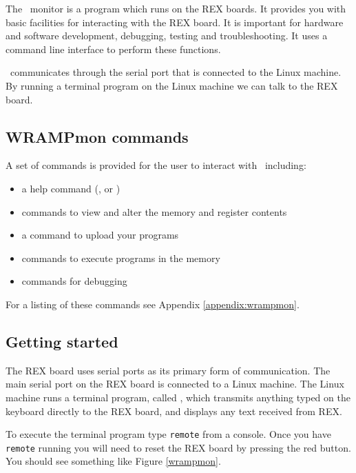 The \WRAMPmon\ monitor is a program which runs on the REX boards.  It
provides you with basic facilities for interacting with the REX board.
It is important for hardware and software development, debugging,
testing and troubleshooting.  It uses a command line interface to
perform these functions.

\WRAMPmon\ communicates through the serial port that is connected to the Linux 
machine.  By running a terminal program on the Linux machine we can talk
to the REX board.


\subsection{WRAMPmon commands}
A set of commands is provided for the user to interact with \WRAMPmon\
including:

\begin{itemize}
\item a help command (, or )
\item commands to view and alter the memory and register contents
\item a command to upload your programs
\item commands to execute programs in the memory
\item commands for debugging
\end{itemize}

For a listing of these commands see Appendix \ref{appendix:wrampmon}.

\subsection{Getting started}
The REX board uses serial ports as its primary form of communication.
The main serial port on the REX board is connected to a Linux
machine. The Linux machine runs a terminal program, called
, which transmits anything typed on the keyboard
directly to the REX board, and displays any text received from REX.

To execute the terminal program type \verb|remote| from a console.
Once you have \verb|remote| running you will need to reset the REX
board by pressing the red \src{RESET} button.  You should see
something like Figure \ref{wrampmon}.

